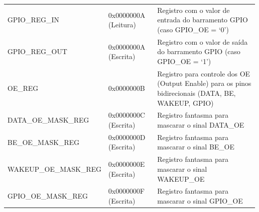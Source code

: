 \begin{longtable}{>{\arraybackslash}p{5cm} >{\centering\arraybackslash}p{3cm} >{\centering\arraybackslash}p{6.4cm}}
    GPIO\_REG\_IN & 0x0000000A (Leitura) & Registro com o valor de entrada do barramento GPIO (caso GPIO\_OE = ‘0’) \\
    GPIO\_REG\_OUT & 0x0000000A (Escrita) & Registro com o valor de saída do barramento GPIO (caso GPIO\_OE = ‘1’) \\
    OE\_REG & 0x0000000B & Registro para controle dos OE (Output Enable) para os pinos bidirecionais (DATA, BE, WAKEUP, GPIO) \\
    DATA\_OE\_MASK\_REG & 0x0000000C (Escrita) & Registro fantasma para mascarar o sinal DATA\_OE \\
    BE\_OE\_MASK\_REG & 0x0000000D (Escrita) & Registro fantasma para mascarar o sinal BE\_OE \\
    WAKEUP\_OE\_MASK\_REG & 0x0000000E (Escrita) & Registro fantasma para mascarar o sinal WAKEUP\_OE \\
    GPIO\_OE\_MASK\_REG & 0x0000000F (Escrita) & Registro fantasma para mascarar o sinal GPIO\_OE \\

	\end{longtable}


